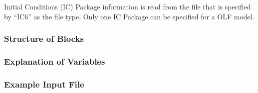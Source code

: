 Initial Conditions (IC) Package information is read from the file that is specified by ``IC6'' as the file type.  Only one IC Package can be specified for a OLF model. 

\vspace{5mm}
\subsubsection{Structure of Blocks}
%


\vspace{5mm}
\subsubsection{Explanation of Variables}
\begin{description}

\end{description}

\vspace{5mm}
\subsubsection{Example Input File}


